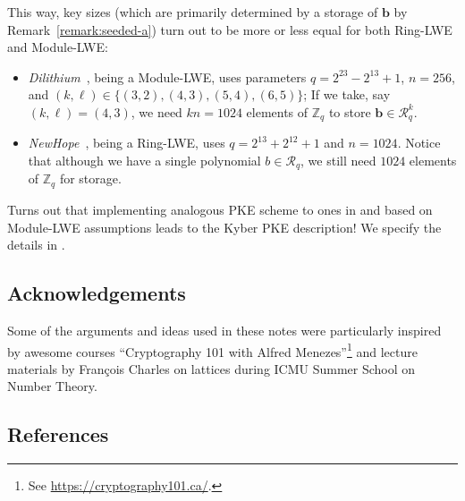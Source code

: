 \documentclass{template}
\begin{document}
This way, key sizes (which are primarily determined by a storage of $\mathbf{b}$
by Remark~\ref{remark:seeded-a}) turn out to be more or less equal for both
Ring-LWE and Module-LWE:
\begin{itemize}
    \item \textit{Dilithium}~\cite{dilithium}, being a Module-LWE, uses
    parameters $q=2^{23}-2^{13}+1$, $n=256$, and $(k,\ell) \in
    \{(3,2),(4,3),(5,4),(6,5)\}$; If we take, say $(k,\ell)=(4,3)$, we need $kn
    = 1024$ elements of $\mathbb{Z}_q$ to store $\mathbf{b} \in
    \mathcal{R}_q^{k}$.
    \item \textit{NewHope}~\cite{new-hope}, being a Ring-LWE, uses
    $q=2^{13}+2^{12}+1$ and $n=1024$. Notice that although we have a single
    polynomial $b \in \mathcal{R}_q$, we still need $1024$ elements of
    $\mathbb{Z}_q$ for storage.
\end{itemize}

Turns out that implementing analogous PKE scheme to ones in 
and  based on Module-LWE assumptions leads to the Kyber PKE
description! We specify the details in .

\subsection*{Acknowledgements}

Some of the arguments and ideas used in these notes were particularly inspired
by awesome courses ``Cryptography 101 with Alfred Menezes''\footnote{See
\url{https://cryptography101.ca/}.} and lecture materials by François Charles on
lattices during ICMU Summer School on Number Theory.

\subsection*{References}
\footnotesize
\renewcommand{\refname}{\vspace{-1em}}


\end{document}

